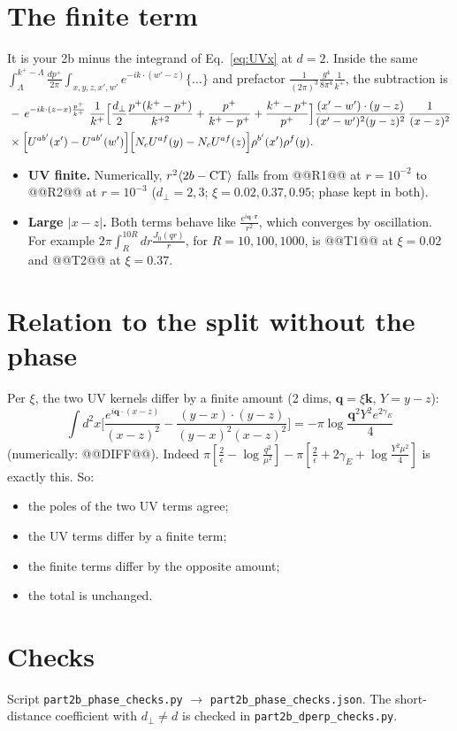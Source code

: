 \documentclass[10pt]{article}
\numberwithin{equation}{section}
\newcommand{\phx}{e^{-ik\cdot(z-x)\frac{p^{+}}{k^{+}}}}
\begin{document}
\section{The finite term}
It is your 2b minus the integrand of Eq.~\eqref{eq:UVx} at $d=2$. Inside the same $\int_\Lambda^{k^+-\Lambda}\frac{dp^+}{2\pi}\int_{x,y,z,x',w'}e^{-ik\cdot(w'-z)}\{\dots\}$ and prefactor $\frac{1}{(2\pi)^3}\frac{g^4}{8\pi^4}\frac{1}{k^+}$, the subtraction is
\begin{align}
&-\,\phx\;\frac{1}{k^{+}}\Big[\frac{d_\perp}{2}\frac{p^{+}(k^{+}-p^{+})}{k^{+2}}+\frac{p^{+}}{k^{+}-p^{+}}+\frac{k^{+}-p^{+}}{p^{+}}\Big]\frac{(x'-w')\cdot(y-z)}{(x'-w')^{2}(y-z)^{2}}\,\frac{1}{(x-z)^{2}}\notag\\
&\times\Big[U^{ab'}(x')-U^{ab'}(w')\Big]\Big[N_cU^{af}(y)-N_cU^{af}(z)\Big]\rho^{b'}(x')\rho^{f}(y).
\end{align}
\begin{itemize}
\item \textbf{UV finite.} Numerically, $r^2\langle2b-{\rm CT}\rangle$ falls from @@R1@@ at $r=10^{-2}$ to @@R2@@ at $r=10^{-3}$ ($d_\perp=2,3$; $\xi=0.02,0.37,0.95$; phase kept in both).
\item \textbf{Large $|x-z|$.} Both terms behave like $\frac{e^{i\mathbf q\cdot\mathbf r}}{r^2}$, which converges by oscillation. For example $2\pi\int_R^{10R}dr\frac{J_0(qr)}{r}$, for $R=10,100,1000$, is @@T1@@ at $\xi=0.02$ and @@T2@@ at $\xi=0.37$.
\end{itemize}

\section{Relation to the split without the phase}
Per $\xi$, the two UV kernels differ by a finite amount (2 dims, $\mathbf q=\xi\mathbf k$, $Y=y-z$):
\begin{equation}
\int d^2x\Big[\frac{e^{i\mathbf q\cdot(x-z)}}{(x-z)^2}-\frac{(y-x)\cdot(y-z)}{(y-x)^2(x-z)^2}\Big]=-\pi\log\frac{\mathbf q^2Y^2e^{2\gamma_E}}{4}
\end{equation}
(numerically: @@DIFF@@). Indeed $\pi[\frac2\epsilon-\log\frac{q^2}{\mu^2}]-\pi[\frac2\epsilon+2\gamma_E+\log\frac{Y^2\mu^2}{4}]$ is exactly this. So:
\begin{itemize}
\item the poles of the two UV terms agree;
\item the UV terms differ by a finite term;
\item the finite terms differ by the opposite amount;
\item the total is unchanged.
\end{itemize}

\section*{Checks}
Script \texttt{part2b\_phase\_checks.py} $\to$ \texttt{part2b\_phase\_checks.json}. The short-distance coefficient with $d_\perp\neq d$ is checked in \texttt{part2b\_dperp\_checks.py}.
\end{document}
